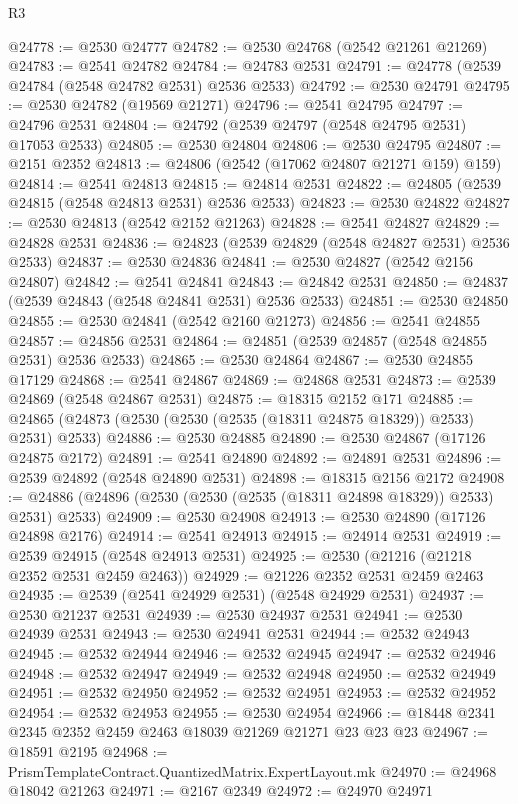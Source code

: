 \begin{lexlean}{R3}
\begin{coremodule}
@24778 := @2530 @24777
@24782 := @2530 @24768 (@2542 @21261 @21269)
@24783 := @2541 @24782
@24784 := @24783 @2531
@24791 := @24778 (@2539 @24784 (@2548 @24782 @2531) @2536 @2533)
@24792 := @2530 @24791
@24795 := @2530 @24782 (@19569 @21271)
@24796 := @2541 @24795
@24797 := @24796 @2531
@24804 := @24792 (@2539 @24797 (@2548 @24795 @2531) @17053 @2533)
@24805 := @2530 @24804
@24806 := @2530 @24795
@24807 := @2151 @2352
@24813 := @24806 (@2542 (@17062 @24807 @21271 @159) @159)
@24814 := @2541 @24813
@24815 := @24814 @2531
@24822 := @24805 (@2539 @24815 (@2548 @24813 @2531) @2536 @2533)
@24823 := @2530 @24822
@24827 := @2530 @24813 (@2542 @2152 @21263)
@24828 := @2541 @24827
@24829 := @24828 @2531
@24836 := @24823 (@2539 @24829 (@2548 @24827 @2531) @2536 @2533)
@24837 := @2530 @24836
@24841 := @2530 @24827 (@2542 @2156 @24807)
@24842 := @2541 @24841
@24843 := @24842 @2531
@24850 := @24837 (@2539 @24843 (@2548 @24841 @2531) @2536 @2533)
@24851 := @2530 @24850
@24855 := @2530 @24841 (@2542 @2160 @21273)
@24856 := @2541 @24855
@24857 := @24856 @2531
@24864 := @24851 (@2539 @24857 (@2548 @24855 @2531) @2536 @2533)
@24865 := @2530 @24864
@24867 := @2530 @24855 @17129
@24868 := @2541 @24867
@24869 := @24868 @2531
@24873 := @2539 @24869 (@2548 @24867 @2531)
@24875 := @18315 @2152 @171
@24885 := @24865 (@24873 (@2530 (@2530 (@2535 (@18311 @24875 @18329)) @2533) @2531) @2533)
@24886 := @2530 @24885
@24890 := @2530 @24867 (@17126 @24875 @2172)
@24891 := @2541 @24890
@24892 := @24891 @2531
@24896 := @2539 @24892 (@2548 @24890 @2531)
@24898 := @18315 @2156 @2172
@24908 := @24886 (@24896 (@2530 (@2530 (@2535 (@18311 @24898 @18329)) @2533) @2531) @2533)
@24909 := @2530 @24908
@24913 := @2530 @24890 (@17126 @24898 @2176)
@24914 := @2541 @24913
@24915 := @24914 @2531
@24919 := @2539 @24915 (@2548 @24913 @2531)
@24925 := @2530 (@21216 (@21218 @2352 @2531 @2459 @2463))
@24929 := @21226 @2352 @2531 @2459 @2463
@24935 := @2539 (@2541 @24929 @2531) (@2548 @24929 @2531)
@24937 := @2530 @21237 @2531
@24939 := @2530 @24937 @2531
@24941 := @2530 @24939 @2531
@24943 := @2530 @24941 @2531
@24944 := @2532 @24943
@24945 := @2532 @24944
@24946 := @2532 @24945
@24947 := @2532 @24946
@24948 := @2532 @24947
@24949 := @2532 @24948
@24950 := @2532 @24949
@24951 := @2532 @24950
@24952 := @2532 @24951
@24953 := @2532 @24952
@24954 := @2532 @24953
@24955 := @2530 @24954
@24966 := @18448 @2341 @2345 @2352 @2459 @2463 @18039 @21269 @21271 @23 @23 @23
@24967 := @18591 @2195
@24968 := PrismTemplateContract.QuantizedMatrix.ExpertLayout.mk
@24970 := @24968 @18042 @21263
@24971 := @2167 @2349
@24972 := @24970 @24971

\end{coremodule}
\end{lexlean}
